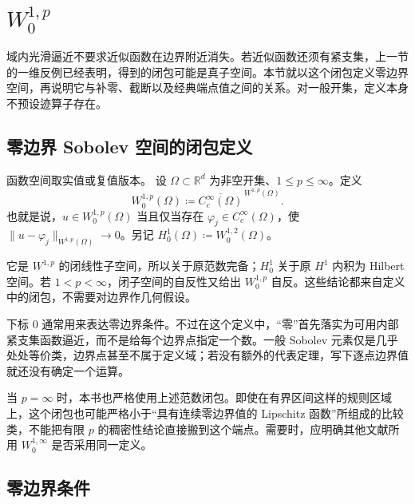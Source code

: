 \section{\texorpdfstring{\(W_0^{1,p}\)}{W₀(1,p)}}
\label{b1:sec:2202}

域内光滑逼近不要求近似函数在边界附近消失。若近似函数还须有紧支集，上一节的一维反例已经表明，得到的闭包可能是真子空间。本节就以这个闭包定义零边界空间，再说明它与补零、截断以及经典端点值之间的关系。对一般开集，定义本身不预设迹算子存在。

\subsection{零边界 Sobolev 空间的闭包定义}
\label{b1:subsec:220201}

\begin{definition}\label{b1:def:sobolev-zero-boundary}
函数空间取实值或复值版本。
设 \(\Omega\subset\mathbb R^d\) 为非空开集、\(1\le p\le\infty\)。定义
\[
 W_0^{1,p}(\Omega)
 \coloneqq\overline{C_c^\infty(\Omega)}^{\,W^{1,p}(\Omega)}.
\]
也就是说，\(u\in W_0^{1,p}(\Omega)\) 当且仅当存在 \(\varphi_j\in C_c^\infty(\Omega)\)，使 \(\|u-\varphi_j\|_{W^{1,p}(\Omega)}\to0\)。另记 \(H_0^1(\Omega)\coloneqq W_0^{1,2}(\Omega)\)。
\end{definition}

它是 \(W^{1,p}\) 的闭线性子空间，所以关于原范数完备；\(H_0^1\) 关于原 \(H^1\) 内积为 Hilbert 空间。若 \(1<p<\infty\)，闭子空间的自反性又给出 \(W_0^{1,p}\) 自反。这些结论都来自定义中的闭包，不需要对边界作几何假设。

\ProseParagraphBreak

下标 \(0\) 通常用来表达零边界条件。不过在这个定义中，“零”首先落实为可用内部紧支集函数逼近，而不是给每个边界点指定一个数。一般 Sobolev 元素仅是几乎处处等价类，边界点甚至不属于定义域；若没有额外的代表定理，写下逐点边界值就还没有确定一个运算。

\ProseParagraphBreak

当 \(p=\infty\) 时，本书也严格使用上述范数闭包。即使在有界区间这样的规则区域上，这个闭包也可能严格小于“具有连续零边界值的 Lipschitz 函数”所组成的比较类，不能把有限 \(p\) 的稠密性结论直接搬到这个端点。需要时，应明确其他文献所用 \(W_0^{1,\infty}\) 是否采用同一定义。

\subsection{零边界条件}
\label{b1:subsec:220202}

